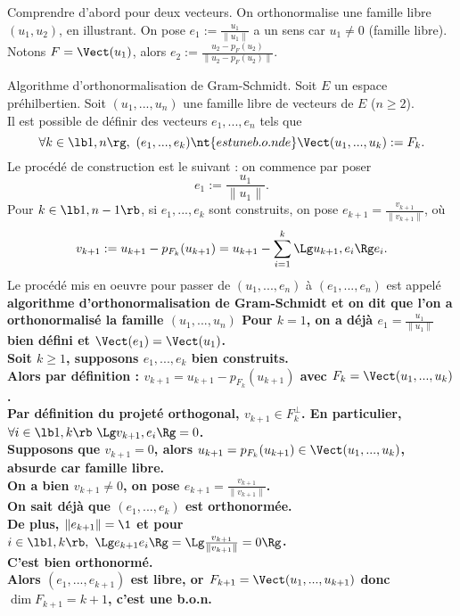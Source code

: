 \documentclass[11pt]{article}
\begin{document}
\begin{ex}{Comprendre d'abord pour deux vecteurs.}{}
    On orthonormalise une famille libre $(u_1, u_2)$, en illustrant.
    \tcblower
    On pose $e_1:=\frac{u_1}{\|u_1\|}$ a un sens car $u_1\neq0$ (famille libre).\\
    Notons $F=\Vect(u_1)$, alors $e_2:=\frac{u_2-p_F(u_2)}{\|u_2-p_F(u_2)\|}$. 
\end{ex}


\begin{prop}{Algorithme d'orthonormalisation de Gram-Schmidt.}{}
    Soit $E$ un espace préhilbertien. Soit $(u_1,...,u_n)$ une famille libre de vecteurs de $E$ ($n\geq2$).\\
    Il est possible de définir des vecteurs $e_1,...,e_n$ tels que
    \begin{equation*}
        \forall k \in \lb1,n\rg, ~ (e_1,...,e_k) \nt{ est une b.o.n de } \Vect(u_1,...,u_k):=F_k.
    \end{equation*}
    Le procédé de construction est le suivant : on commence par poser
    \begin{equation*}
        e_1 := \frac{u_1}{\|u_1\|}.
    \end{equation*}
    Pour $k\in\lb1,n-1\rb$, si $e_1,...,e_k$ sont construits, on pose $e_{k+1}=\frac{v_{k+1}}{\|v_{k+1}\|}$, où
    \begin{equation*}
        v_{k+1}:=u_{k+1}-p_{F_k}(u_{k+1})=u_{k+1}-\sum_{i=1}^k\Lg u_{k+1},e_i\Rg e_i.
    \end{equation*}
    Le procédé mis en oeuvre pour passer de $(u_1,...,e_n)$ à $(e_1,...,e_n)$ est appelé \bf{algorithme d'orthonormalisation de Gram-Schmidt} et on dit que l'on a orthonormalisé la famille $(u_1,...,u_n)$
    \tcblower
    Pour $k=1$, on a déjà $e_1=\frac{u_1}{\|u_1\|}$ bien défini et $\Vect(e_1)=\Vect(u_1)$.\\
    Soit $k\geq1$, supposons $e_1,...,e_k$ bien construits.\\
    Alors par définition : $v_{k+1}=u_{k+1}-p_{F_k}(u_{k+1})$ avec $F_k=\Vect(u_1,...,u_k)$.\\
    Par définition du projeté orthogonal, $v_{k+1}\in F_k^\bot$. En particulier, $\forall i \in \lb1,k\rb ~ \Lg v_{k+1}, e_i\Rg = 0$.\\
    Supposons que $v_{k+1}=0$, alors $u_{k+1}=p_{F_k}(u_{k+1})\in\Vect(u_1,...,u_k)$, absurde car famille libre.\\
    On a bien $v_{k+1}\neq0$, on pose $e_{k+1}=\frac{v_{k+1}}{\|v_{k+1}\|}$.\\
    On sait déjà que $(e_1,...,e_k)$ est orthonormée.\\
    De plus, $\|e_{k+1}\|=\1$ et pour $i\in\lb1,k\rb, ~\Lg e_{k+1} e_i \Rg = \Lg\frac{v_{k+1}}{\|v_{k+1}\|}=0 \Rg$.\\
    C'est bien orthonormé.\\
    Alors $(e_1,...,e_{k+1})$ est libre, or $F_{k+1}=\Vect(u_1,...,u_{k+1})$ donc $\dim F_{k+1}=k+1$, c'est une b.o.n.
\end{prop}
\end{document}
